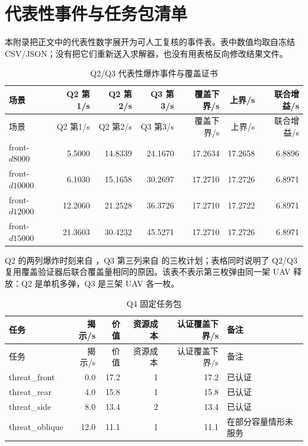 \section{代表性事件与任务包清单}

本附录把正文中的代表性数字展开为可人工复核的事件表。表中数值均取自冻结 CSV/JSON；没有把它们重新送入求解器，也没有用表格反向修改结果文件。

\begin{longtable}{lrrrrrr}
\caption{Q2/Q3 代表性爆炸事件与覆盖证书}\label{tab:event-manifest}\\
\toprule
场景 & Q2 第1/s & Q2 第2/s & Q3 第3/s & 覆盖下界/s & 上界/s & 联合增益/s \\
\midrule
\endfirsthead
\toprule
场景 & Q2 第1/s & Q2 第2/s & Q3 第3/s & 覆盖下界/s & 上界/s & 联合增益/s \\
\midrule
\endhead
front-$d8000$ & 5.5000 & 14.8339 & 24.1670 & 17.2634 & 17.2658 & 6.8896 \\
front-$d10000$ & 6.1030 & 15.1658 & 30.2697 & 17.2710 & 17.2726 & 6.8971 \\
front-$d12000$ & 12.2060 & 21.2528 & 36.3726 & 17.2710 & 17.2722 & 6.8971 \\
front-$d15000$ & 21.3603 & 30.4232 & 45.5271 & 17.2710 & 17.2726 & 6.8971 \\
\bottomrule
\end{longtable}

Q2 的两列爆炸时刻来自 ，Q3 第三列来自  的三枚计划；表格同时说明了 Q2/Q3 复用覆盖验证器后联合覆盖量相同的原因。该表不表示第三枚弹由同一架 UAV 释放：Q2 是单机多弹，Q3 是三架 UAV 各一枚。

\begin{longtable}{lrrrrl}
\caption{Q4 固定任务包}\label{tab:task-manifest}\\
\toprule
任务 & 揭示/s & 价值 & 资源成本 & 认证覆盖下界/s & 备注 \\
\midrule
\endfirsthead
\toprule
任务 & 揭示/s & 价值 & 资源成本 & 认证覆盖下界/s & 备注 \\
\midrule
\endhead
threat\_front & 0.0 & 17.2 & 1 & 17.2 & 已认证 \\
threat\_rear & 4.0 & 15.8 & 1 & 15.8 & 已认证 \\
threat\_side & 8.0 & 13.4 & 2 & 13.4 & 已认证 \\
threat\_oblique & 12.0 & 11.1 & 1 & 11.1 & 在部分容量情形未服务 \\
\bottomrule
\end{longtable}

